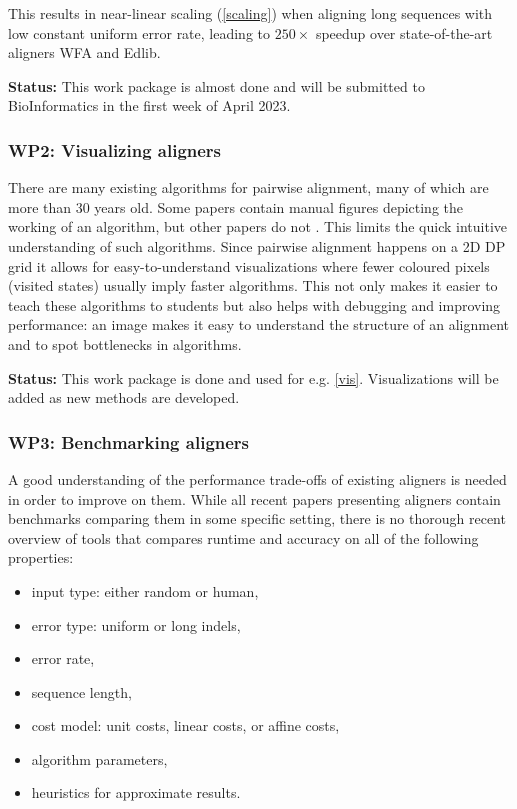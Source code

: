 \documentclass[11pt,english,a4paper]{article}
\begin{document}
This results in near-linear scaling (\ref{scaling}) when aligning long sequences with low constant uniform error
rate, leading to \(250\times\) speedup over state-of-the-art aligners WFA and Edlib.

\textbf{Status:} This work package is almost done and will be submitted to
 BioInformatics in the first week of April 2023.

\subsubsection{WP2: Visualizing aligners}
\label{sec:org1294108}
There are many existing algorithms for pairwise alignment, many of which are
more than 30 years old. Some papers \autocite{ukkonen85,block-aligner} contain
manual figures depicting the working of an algorithm, but other papers do not
\autocite{edlib,wfa}. This limits the quick intuitive understanding of such
algorithms. Since pairwise alignment happens on a 2D DP grid it allows for
easy-to-understand visualizations where fewer coloured pixels (visited states)
usually imply faster algorithms. This not only makes it easier to teach these algorithms
to students but also helps with debugging and improving performance: an
image makes it easy to understand the structure of an alignment and to spot
bottlenecks in algorithms.

\textbf{Status:} This work package is done and used for e.g. \ref{vis}. Visualizations will
be added as new methods are developed.

\subsubsection{WP3: Benchmarking aligners}
\label{sec:org18ba3e7}
A good understanding of the performance trade-offs of existing aligners is
needed in order to improve on them.
While all recent papers presenting aligners
contain benchmarks comparing them in some specific setting,
there is no thorough recent overview of tools that compares runtime and accuracy on all of the
following properties:
\begin{itemize}
\item input type: either random or human,
\item error type: uniform or long indels,
\item error rate,
\item sequence length,
\item cost model: unit costs, linear costs, or affine costs,
\item algorithm parameters,
\item heuristics for approximate results.
\end{itemize}
\end{document}
